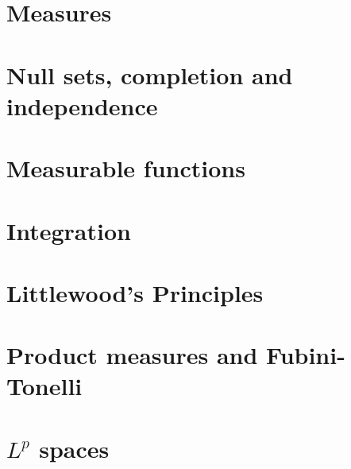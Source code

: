 \documentclass{easyclass}
\begin{document}
\chapter{Measures}



\chapter{Null sets, completion and independence}



\chapter{Measurable functions}



\chapter{Integration}



\chapter{Littlewood's Principles}



\chapter{Product measures and Fubini-Tonelli}



\chapter{\texorpdfstring{$L^p$}{} spaces}






% 
\end{document}
